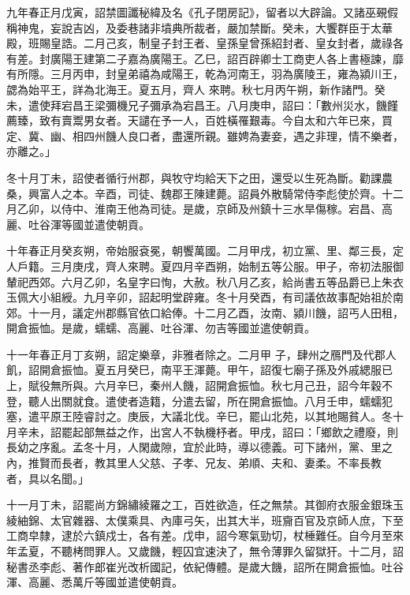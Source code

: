 \begin{pinyinscope}
 九年春正月戊寅，詔禁圖讖秘緯及名《孔子閉房記》，留者以大辟論。又諸巫覡假稱神鬼，妄說吉凶，及委巷諸非墳典所裁者，嚴加禁斷。癸未，大饗群臣于太華殿，班賜皇誥。二月己亥，制皇子封王者、皇孫皇曾孫紹封者、皇女封者，歲祿各有差。封廣陽王建第二子嘉為廣陽王。乙巳，詔百辟卿士工商吏人各上書極諫，靡有所隱。三月丙申，封皇弟禧為咸陽王，乾為河南王，羽為廣陵王，雍為潁川王，勰為始平王，詳為北海王。夏五月，齊人
 來聘。秋七月丙午朔，新作諸門。癸未，遣使拜宕昌王梁彌機兄子彌承為宕昌王。八月庚申，詔曰：「數州災水，饑饉薦臻，致有賣鬻男女者。天譴在予一人，百姓橫罹艱毒。今自太和六年已來，買定、冀、幽、相四州饑人良口者，盡還所親。雖娉為妻妾，遇之非理，情不樂者，亦離之。」



 冬十月丁未，詔使者循行州郡，與牧守均給天下之田，還受以生死為斷。勸課農桑，興富人之本。辛酉，司徒、魏郡王陳建薨。詔員外散騎常侍李彪使於齊。十二月乙卯，以侍中、淮南王他為司徒。是歲，京師及州鎮十三水旱傷稼。宕昌、高麗、吐谷渾等國並遣使朝貢。



 十年春正月癸亥朔，帝始服袞冕，朝饗萬國。二月甲戌，初立黨、里、鄰三長，定人戶籍。三月庚戌，齊人來聘。夏四月辛酉朔，始制五等公服。甲子，帝初法服御輦祀西郊。六月乙卯，名皇字曰恂，大赦。秋八月乙亥，給尚書五等品爵已上朱衣玉佩大小組綬。九月辛卯，詔起明堂辟雍。冬十月癸酉，有司議依故事配始祖於南郊。十一月，議定州郡縣官依口給俸。十二月乙酉，汝南、潁川饑，詔丐人田租，開倉振恤。是歲，蠕蠕、高麗、吐谷渾、勿吉等國並遣使朝貢。



 十一年春正月丁亥朔，詔定樂章，非雅者除之。二月甲
 子，肆州之鴈門及代郡人飢，詔開倉振恤。夏五月癸巳，南平王渾薨。甲午，詔復七廟子孫及外戚緦服已上，賦役無所與。六月辛巳，秦州人饑，詔開倉振恤。秋七月己丑，詔今年穀不登，聽人出關就食。遣使者造籍，分遣去留，所在開倉振恤。八月壬申，蠕蠕犯塞，遣平原王陸睿討之。庚辰，大議北伐。辛巳，罷山北苑，以其地賜貧人。冬十月辛未，詔罷起部無益之作，出宮人不執機杼者。甲戌，詔曰：「鄉飲之禮廢，則長幼之序亂。孟冬十月，人閑歲隙，宜於此時，導以德義。可下諸州，黨、里之內，推賢而長者，教其里人父慈、子孝、兄友、弟順、夫和、妻柔。不率長教
 者，具以名聞。」



 十一月丁未，詔罷尚方錦繡綾羅之工，百姓欲造，任之無禁。其御府衣服金銀珠玉綾紬錦、太官雜器、太僕乘具、內庫弓矢，出其大半，班齎百官及京師人庶，下至工商皁隸，逮於六鎮戍士，各有差。戊申，詔今寒氣勁切，杖棰難任。自今月至來年孟夏，不聽栲問罪人。又歲饑，輕囚宜速決了，無令薄罪久留獄犴。十二月，詔秘書丞李彪、著作郎崔光改析國記，依紀傳體。是歲大饑，詔所在開倉振恤。吐谷渾、高麗、悉萬斤等國並遣使朝貢。




\end{pinyinscope}

